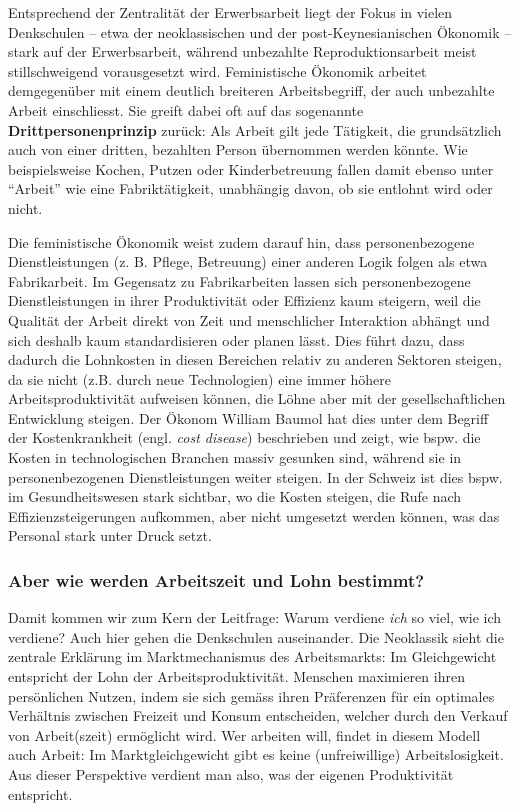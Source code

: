 \documentclass[
  nswissgerman,
  a4paper,
  DIV=11,
  numbers=noendperiod,
  oneside,
  openany]{scrreprt}
\begin{document}
Entsprechend der Zentralität der Erwerbsarbeit liegt der Fokus in vielen
Denkschulen -- etwa der neoklassischen und der post-Keynesianischen
Ökonomik -- stark auf der Erwerbsarbeit, während unbezahlte
Reproduktionsarbeit meist stillschweigend vorausgesetzt wird.
Feministische Ökonomik arbeitet demgegenüber mit einem deutlich
breiteren Arbeitsbegriff, der auch unbezahlte Arbeit einschliesst. Sie
greift dabei oft auf das sogenannte \textbf{Drittpersonenprinzip}
zurück: Als Arbeit gilt jede Tätigkeit, die grundsätzlich auch von einer
dritten, bezahlten Person übernommen werden könnte. Wie beispielsweise
Kochen, Putzen oder Kinderbetreuung fallen damit ebenso unter ``Arbeit''
wie eine Fabriktätigkeit, unabhängig davon, ob sie entlohnt wird oder
nicht.

Die feministische Ökonomik weist zudem darauf hin, dass personenbezogene
Dienstleistungen (z. B. Pflege, Betreuung) einer anderen Logik folgen
als etwa Fabrikarbeit. Im Gegensatz zu Fabrikarbeiten lassen sich
personenbezogene Dienstleistungen in ihrer Produktivität oder Effizienz
kaum steigern, weil die Qualität der Arbeit direkt von Zeit und
menschlicher Interaktion abhängt und sich deshalb kaum standardisieren
oder planen lässt. Dies führt dazu, dass dadurch die Lohnkosten in
diesen Bereichen relativ zu anderen Sektoren steigen, da sie nicht (z.B.
durch neue Technologien) eine immer höhere Arbeitsproduktivität
aufweisen können, die Löhne aber mit der gesellschaftlichen Entwicklung
steigen. Der Ökonom William Baumol hat dies unter dem Begriff der
Kostenkrankheit (engl. \emph{cost disease}) beschrieben und zeigt, wie
bspw. die Kosten in technologischen Branchen massiv gesunken sind,
während sie in personenbezogenen Dienstleistungen weiter steigen. In der
Schweiz ist dies bspw. im Gesundheitswesen stark sichtbar, wo die Kosten
steigen, die Rufe nach Effizienzsteigerungen aufkommen, aber nicht
umgesetzt werden können, was das Personal stark unter Druck setzt.

\subsubsection{Aber wie werden Arbeitszeit und Lohn
bestimmt?}\label{aber-wie-werden-arbeitszeit-und-lohn-bestimmt}

Damit kommen wir zum Kern der Leitfrage: Warum verdiene \emph{ich} so
viel, wie ich verdiene? Auch hier gehen die Denkschulen auseinander. Die
Neoklassik sieht die zentrale Erklärung im Marktmechanismus des
Arbeitsmarkts: Im Gleichgewicht entspricht der Lohn der
Arbeitsproduktivität. Menschen maximieren ihren persönlichen Nutzen,
indem sie sich gemäss ihren Präferenzen für ein optimales Verhältnis
zwischen Freizeit und Konsum entscheiden, welcher durch den Verkauf von
Arbeit(szeit) ermöglicht wird. Wer arbeiten will, findet in diesem
Modell auch Arbeit: Im Marktgleichgewicht gibt es keine (unfreiwillige)
Arbeitslosigkeit. Aus dieser Perspektive verdient man also, was der
eigenen Produktivität entspricht.
\end{document}
